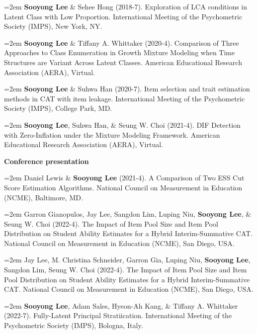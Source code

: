\documentclass[11pt,a4paper,]{awesome-cv}
\begin{document}
\hangindent=2em  \textbf{Sooyong Lee} \& Sehee Hong
(2018-7). Exploration of LCA conditions in Latent Class with Low
Proportion. International Meeting of the Psychometric Society (IMPS),
New York, NY.

\hangindent=2em  \textbf{Sooyong Lee} \& Tiffany A.
Whittaker (2020-4). Comparison of Three Approaches to Class Enumeration
in Growth Mixture Modeling when Time Structures are Variant Across
Latent Classes. American Educational Research Association (AERA),
Virtual.

\hangindent=2em  \textbf{Sooyong Lee} \& Suhwa Han (2020-7).
Item selection and trait estimation methods in CAT with item leakage.
International Meeting of the Psychometric Society (IMPS), College Park,
MD.

\hangindent=2em  \textbf{Sooyong Lee}, Suhwa Han, \& Seung
W. Choi (2021-4). DIF Detection with Zero-Inflation under the Mixture
Modeling Framework. American Educational Research Association (AERA),
Virtual.

\setlength{\leftskip}{0cm}

\textbf{Conference presentation}

\setlength{\leftskip}{0.5cm}

\hangindent=2em  Daniel Lewis \& \textbf{Sooyong Lee}
(2021-4). A Comparison of Two ESS Cut Score Estimation Algorithms.
National Council on Measurement in Education (NCME), Baltimore, MD.

\hangindent=2em  Garron Gianopulos, Jay Lee, Sangdon Lim,
Luping Niu, \textbf{Sooyong Lee}, \& Seung W. Choi (2022-4). The Impact
of Item Pool Size and Item Pool Distribution on Student Ability
Estimates for a Hybrid Interim-Summative CAT. National Council on
Measurement in Education (NCME), San Diego, USA.

\hangindent=2em  Jay Lee, M. Christina Schneider, Garron
Gia, Luping Niu, \textbf{Sooyong Lee}, Sangdon Lim, Seung W. Choi
(2022-4). The Impact of Item Pool Size and Item Pool Distribution on
Student Ability Estimates for a Hybrid Interim-Summative CAT. National
Council on Measurement in Education (NCME), San Diego, USA.

\hangindent=2em  \textbf{Sooyong Lee}, Adam Sales, Hyeon-Ah
Kang, \& Tiffany A. Whittaker (2022-7). Fully-Latent Principal
Stratiication. International Meeting of the Psychometric Society (IMPS),
Bologna, Italy.

\setlength{\leftskip}{0cm}
\end{document}
